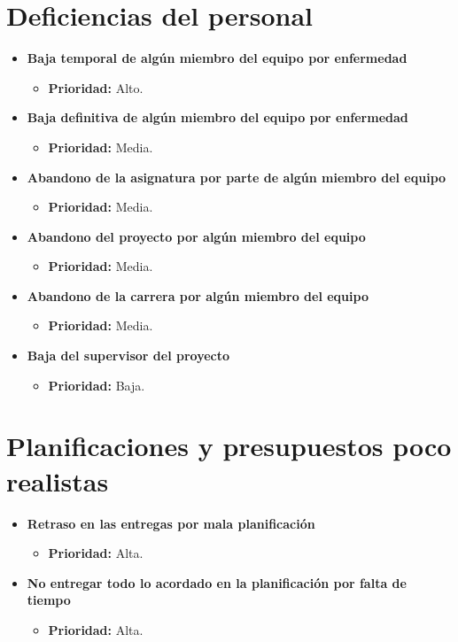 \documentclass[spanish,a4paper,11pt, twoside]{report}	%
\begin{document}
\section{Deficiencias del personal}
	\begin{itemize}
		\item \textbf{Baja temporal de algún miembro del equipo por enfermedad}
			\begin{itemize}
				\item \textbf{Prioridad: }Alto.		
			\end{itemize}
		
		\item \textbf{Baja definitiva de algún miembro del equipo por enfermedad}	
			\begin{itemize}
				\item \textbf{Prioridad: }Media.
			\end{itemize}
		
		\item \textbf{Abandono de la asignatura por parte de algún miembro del equipo}	
			\begin{itemize}
				\item \textbf{Prioridad: }Media.
			\end{itemize}
		
		\item \textbf{Abandono del proyecto por algún miembro del equipo}	
			\begin{itemize}
				\item \textbf{Prioridad: }Media.
			\end{itemize}
		
		\item \textbf{Abandono de la carrera por algún miembro del equipo}
			\begin{itemize}
				\item \textbf{Prioridad: }Media.
			\end{itemize}
		
		\item \textbf{Baja del supervisor del proyecto}
			\begin{itemize}
				\item \textbf{Prioridad: }Baja.
			\end{itemize}
	\end{itemize}
%
\section{Planificaciones y presupuestos poco realistas}
	\begin{itemize}
		\item \textbf{Retraso en las entregas por mala planificación}%
			\begin{itemize}
				\item \textbf{Prioridad: }Alta.
			\end{itemize}
		
		\item \textbf{No entregar todo lo acordado en la planificación por falta de tiempo}%
			\begin{itemize}
				\item \textbf{Prioridad: }Alta.
			\end{itemize}
	\end{itemize}
%
\end{document}
